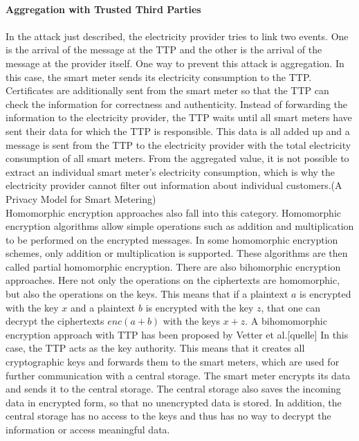 \\
\textbf{Aggregation with Trusted Third Parties}
\\
\\
In the attack just described, the electricity provider tries to link two events. One is the arrival of the message at the TTP and the other is the arrival of the message at the provider itself. One way to prevent this attack is aggregation. In this case, the smart meter sends its electricity consumption to the TTP. Certificates are additionally sent from the smart meter so that the TTP can check the information for correctness and authenticity. Instead of forwarding the information to the electricity provider, the TTP waits until all smart meters have sent their data for which the TTP is responsible. This data is all added up and a message is sent from the TTP to the electricity provider with the total electricity consumption of all smart meters. From the aggregated value, it is not possible to extract an individual smart meter's electricity consumption, which is why the electricity provider cannot filter out information about individual customers.(A Privacy Model for Smart Metering)\\
Homomorphic encryption approaches also fall into this category. Homomorphic encryption algorithms allow simple operations such as addition and multiplication to be performed on the encrypted messages.  In some homomorphic encryption schemes, only addition or multiplication is supported. These algorithms are then called partial homomorphic encryption.
There are also bihomorphic encryption approaches. Here not only the operations on the ciphertexts are homomorphic, but also the operations on the keys. This means that if a plaintext $a$ is encrypted with the key $x$ and a plaintext $b$ is encrypted with the key $z$, that one can decrypt the ciphertexts $enc(a+b)$ with the keys $x+z$. A bihomomorphic encryption approach with TTP has been proposed by Vetter et al.[quelle] In this case, the TTP acts as the key authority. This means that it creates all cryptographic keys and forwards them to the smart meters, which are used for further communication with a central storage. The smart meter encrypts its data and sends it to the central storage. The central storage also saves the incoming data in encrypted form, so that no unencrypted data is stored. In addition, the central storage has no access to the keys and thus has no way to decrypt the information or access meaningful data.\\
